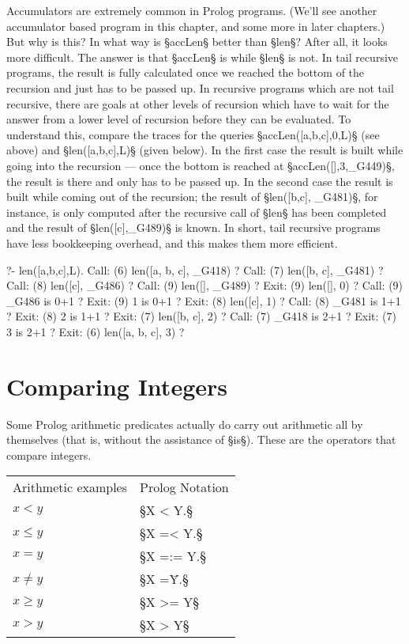 Accumulators are extremely common in Prolog programs.  (We'll see
another accumulator based program in this chapter, and some more in
later chapters.) But why is this? In what way is §accLen§ better than
§len§? After all, it looks more difficult. The answer is that §accLen§
is  while §len§ is not. In tail recursive
programs, the result is fully calculated once we reached the bottom of
the recursion and just has to be passed up. In recursive programs
which are not tail recursive, there are goals at other levels of
recursion which have to wait for the answer from a lower level of
recursion before they can be evaluated. To understand this, compare
the traces for the queries §accLen([a,b,c],0,L)§ (see above) and
§len([a,b,c],L)§ (given below). In the first case the result is
built while going into the recursion --- once the bottom is reached at
§accLen([],3,_G449)§, the result is there and only has to be passed
up. In the second case the result is built while coming out of the
recursion; the result of §len([b,c], _G481)§, for instance, is only
computed after the recursive call of §len§ has been completed and the
result of §len([c],_G489)§ is known. In short, tail recursive programs
have less bookkeeping overhead, and this makes them more efficient.

\begin{LPNcodedisplay}
?- len([a,b,c],L).
   Call: (6) len([a, b, c], _G418) ?
   Call: (7) len([b, c], _G481) ?
   Call: (8) len([c], _G486) ?
   Call: (9) len([], _G489) ?
   Exit: (9) len([], 0) ?
   Call: (9) _G486 is 0+1 ?
   Exit: (9) 1 is 0+1 ?
   Exit: (8) len([c], 1) ?
   Call: (8) _G481 is 1+1 ?
   Exit: (8) 2 is 1+1 ?
   Exit: (7) len([b, c], 2) ?
   Call: (7) _G418 is 2+1 ?
   Exit: (7) 3 is 2+1 ?
   Exit: (6) len([a, b, c], 3) ?
\end{LPNcodedisplay}


\section{Comparing Integers}\label{SEC.L5.COMPARING-INTEGERS}



Some Prolog arithmetic predicates actually do carry out arithmetic
all by themselves (that is, without the assistance of §is§).
These are the operators that compare integers.

\begin{center}\begin{tabular}{ll}
Arithmetic examples & Prolog Notation\\
$x<y$&§X < Y.§\\ \index{PROLOG </2@\texttt{</2}}
$x\le y$&§X =< Y.§\\ \index{PROLOG =</2@\texttt{=</2}}
$x=y$&§X =:= Y.§\\ \index{PROLOG =:=/2@\texttt{=:=/2}}
$x\not=y$&§X =\= Y.§\\ \index{PROLOG =\=/2@\verb-=\=/2-}
$x\ge y$&§X >= Y§\\ \index{PROLOG >=/2@\texttt{>=/2}}
$x>y$&§X > Y§ \index{PROLOG >/2@\texttt{>/2}}
\end{tabular}\end{center}

